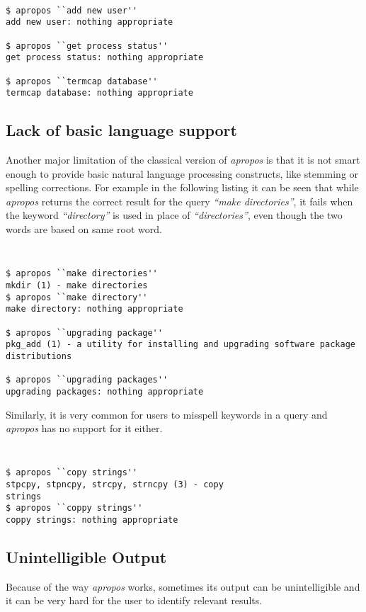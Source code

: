 \documentclass[letterpaper,twocolumn,10pt]{article}
\begin{document}
{\tt \small
{}
\begin{lstlisting}
$ apropos ``add new user''
add new user: nothing appropriate

$ apropos ``get process status''
get process status: nothing appropriate

$ apropos ``termcap database''
termcap database: nothing appropriate
\end{lstlisting}
}

\subsection{Lack of basic language support}
Another major limitation of the classical version of \textit{apropos} is that
it is not smart enough to provide basic natural language processing constructs,
like stemming or spelling corrections.
For example in the following listing it can be seen
that while \textit{apropos} returns the correct result for the query
\textit{``make directories''}, it fails when the keyword \textit{``directory''}
is used in place of \textit{``directories''}, even though the two words are based
on same root word. \\

{\tt \small
{}
\begin{lstlisting}
$ apropos ``make directories''
mkdir (1) - make directories
$ apropos ``make directory''
make directory: nothing appropriate

$ apropos ``upgrading package''
pkg_add (1) - a utility for installing and upgrading software package
distributions

$ apropos ``upgrading packages''
upgrading packages: nothing appropriate
\end{lstlisting}
}

Similarly, it is very common for users to misspell keywords in a query and \textit{apropos} has no support for it either.

{\tt \small
{}
\begin{lstlisting}
$ apropos ``copy strings''
stpcpy, stpncpy, strcpy, strncpy (3) - copy
strings
$ apropos ``coppy strings''
coppy strings: nothing appropriate
\end{lstlisting}
}

\subsection{Unintelligible Output}
Because of the way \textit{apropos} works, sometimes its output can be
unintelligible and it can be very hard for the user to identify relevant results. \\
\end{document}
